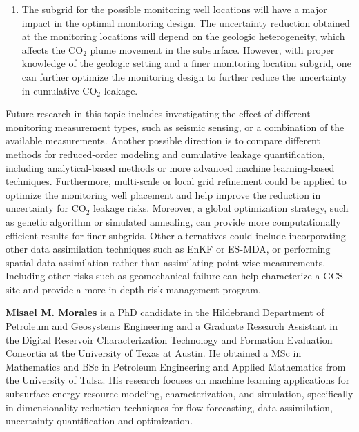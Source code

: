 \documentclass[a4paper,fleqn]{cas-sc}
\begin{document}
\begin{enumerate}
    \item The subgrid for the possible monitoring well locations will have a major impact in the optimal monitoring design. The uncertainty reduction obtained at the monitoring locations will depend on the geologic heterogeneity, which affects the CO$_2$ plume movement in the subsurface. However, with proper knowledge of the geologic setting and a finer monitoring location subgrid, one can further optimize the monitoring design to further reduce the uncertainty in cumulative CO$_2$ leakage.
\end{enumerate}

Future research in this topic includes investigating the effect of different monitoring measurement types, such as seismic sensing, or a combination of the available measurements. Another possible direction is to compare different methods for reduced-order modeling and cumulative leakage quantification, including analytical-based methods or more advanced machine learning-based techniques. Furthermore, multi-scale or local grid refinement could be applied to optimize the monitoring well placement and help improve the reduction in uncertainty for CO$_2$ leakage risks. Moreover, a global optimization strategy, such as genetic algorithm or simulated annealing, can provide more computationally efficient results for finer subgrids. Other alternatives could include incorporating other data assimilation techniques such as EnKF or ES-MDA, or performing spatial data assimilation rather than assimilating point-wise measurements. Including other risks such as geomechanical failure can help characterize a GCS site and provide a more in-depth risk management program. 


\printcredits




\bio{}
{\bf Misael M. Morales} is a PhD candidate in the Hildebrand Department of Petroleum and Geosystems Engineering and a Graduate Research Assistant in the Digital Reservoir Characterization Technology and Formation Evaluation Consortia at the University of Texas at Austin. He obtained a MSc in Mathematics and BSc in Petroleum Engineering and Applied Mathematics from the University of Tulsa. His research focuses on machine learning applications for subsurface energy resource modeling, characterization, and simulation, specifically in dimensionality reduction techniques for flow forecasting, data assimilation, uncertainty quantification and optimization. 
\end{document}
